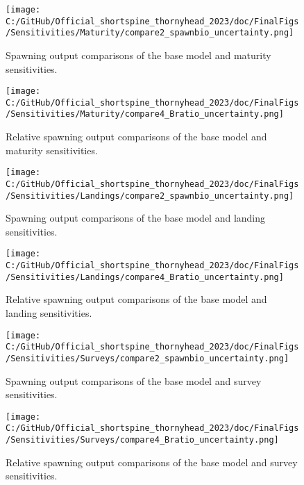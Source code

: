 \documentclass[11pt,
  letterpaper,
]{article}
\begin{document}
\begin{figure}
\centering
\texttt{[image: C:/GitHub/Official\_shortspine\_thornyhead\_2023/doc/FinalFigs/Sensitivities/Maturity/compare2\_spawnbio\_uncertainty.png]}
\caption{Spawning output comparisons of the base model and maturity sensitivities.\label{fig:mat_sensitiv_spawning}}
\end{figure}

\begin{figure}
\centering
\texttt{[image: C:/GitHub/Official\_shortspine\_thornyhead\_2023/doc/FinalFigs/Sensitivities/Maturity/compare4\_Bratio\_uncertainty.png]}
\caption{Relative spawning output comparisons of the base model and maturity sensitivities.\label{fig:mat_sensitiv_mngmt}}
\end{figure}

\begin{figure}
\centering
\texttt{[image: C:/GitHub/Official\_shortspine\_thornyhead\_2023/doc/FinalFigs/Sensitivities/Landings/compare2\_spawnbio\_uncertainty.png]}
\caption{Spawning output comparisons of the base model and landing sensitivities.\label{fig:land_sensitiv_spawning}}
\end{figure}

\begin{figure}
\centering
\texttt{[image: C:/GitHub/Official\_shortspine\_thornyhead\_2023/doc/FinalFigs/Sensitivities/Landings/compare4\_Bratio\_uncertainty.png]}
\caption{Relative spawning output comparisons of the base model and landing sensitivities.\label{fig:land_sensitiv_mngmt}}
\end{figure}

\begin{figure}
\centering
\texttt{[image: C:/GitHub/Official\_shortspine\_thornyhead\_2023/doc/FinalFigs/Sensitivities/Surveys/compare2\_spawnbio\_uncertainty.png]}
\caption{Spawning output comparisons of the base model and survey sensitivities.\label{fig:surv_sensitiv_spawning}}
\end{figure}

\begin{figure}
\centering
\texttt{[image: C:/GitHub/Official\_shortspine\_thornyhead\_2023/doc/FinalFigs/Sensitivities/Surveys/compare4\_Bratio\_uncertainty.png]}
\caption{Relative spawning output comparisons of the base model and survey sensitivities.\label{fig:surv_sensitiv_mngmt}}
\end{figure}
\end{document}
